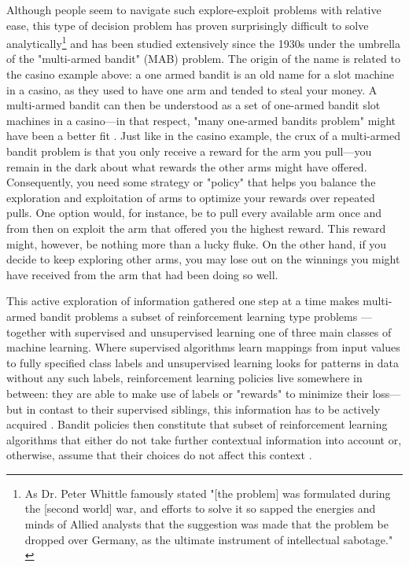 \documentclass{jss}
\begin{document}
Although people seem to navigate such explore-exploit problems with relative ease, this type of decision problem has proven surprisingly difficult to solve analytically\footnote{As Dr. Peter Whittle famously stated "[the problem] was formulated during the [second world] war, and efforts to solve it so sapped the energies and minds of Allied analysts that the suggestion was made that the problem be dropped over Germany, as the ultimate instrument of intellectual sabotage." \citep{Whittle1979}} and has been studied extensively since the 1930s \citep{Robbins1952,Bubeck2012} under the umbrella of the "multi-armed bandit" (MAB) problem. The origin of the name is related to the casino example above: a one armed bandit is an old name for a slot machine in a casino, as they used to have one arm and tended to steal your money. A multi-armed bandit can then be understood as a set of one-armed bandit slot machines in a casino---in that respect, "many one-armed bandits problem" might have been a better fit \citep{2018a}. Just like in the casino example, the crux of a multi-armed bandit problem is that you only receive a reward for the arm you pull---you remain in the dark about what rewards the other arms might have offered. Consequently, you need some strategy or "policy" that helps you balance the exploration and exploitation of arms to optimize your rewards over repeated pulls. One option would, for instance, be to pull every available arm once and from then on exploit the arm that offered you the highest reward. This reward might, however, be nothing more than a lucky fluke. On the other hand, if you decide to keep exploring other arms, you may lose out on the winnings you might have received from the arm that had been doing so well.

This active exploration of information gathered one step at a time makes multi-armed bandit problems a subset of reinforcement learning type problems ---together with supervised and unsupervised learning one of three main classes of machine learning. Where supervised algorithms learn mappings from input values to fully specified class labels and unsupervised learning looks for patterns in data without any such labels, reinforcement learning policies live somewhere in between: they are able to make use of labels or "rewards" to minimize their loss---but in contast to their supervised siblings, this information has to be actively acquired \citep{Jordan2015}. Bandit policies then constitute that subset of reinforcement learning algorithms that either do not take further contextual information into account or, otherwise, assume that their choices do not affect this context \citep{steenwinckel2018self,Sutton1998e}.
\end{document}
